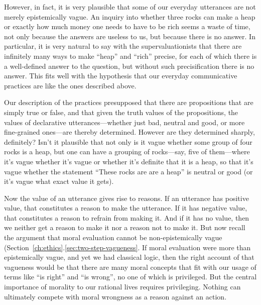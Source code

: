 However, in fact, it is very plausible that some of our everyday utterances are not merely epistemically vague. An inquiry into whether three rocks can make 
a heap or exactly how much money one needs to have to be rich seems a waste of time, not only because the answers are useless to us, 
but because there is no answer. In particular, it is very natural to say with the supervaluationists that there are infinitely many 
ways to make ``heap'' and ``rich'' precise, for each of which there is a well-defined answer to the question, but without such
precisification there is no answer. This fits well with the hypothesis that our everyday communicative practices are  
like the ones described above. 

Our description of the practices presupposed that there are propositions that are simply true or false, and that given the truth
values of the propositions, the values of declarative utterances---whether just bad, neutral and good, or more fine-grained ones---are thereby
determined. However are they determined sharply, definitely? Isn't it plausible that not only is it vague whether some group of four rocks is a heap, 
but one can have a grouping of rocks---say, five of them---where it's vague whether it's vague or whether it's definite that it is a heap, so that 
it's vague whether the statement ``These rocks are are a heap'' is neutral or good (or it's vague what exact value it gets).

Now the value of an utterance gives rise to reasons. If an utterance has positive value, that constitutes a reason to make the utterance.
If it has negative value, that constitutes a reason to refrain from making it. And if it has no value, then we neither get a reason to make
it nor a reason not to make it. But now recall the argument that moral evaluation 
cannot be non-epistemically vague (Section~\ref{ch:ethics}.\ref{sec:two-step-vagueness}. If moral evaluation were more than epistemically vague, and yet we had classical logic, then the right account 
of that vagueness would be that there
are many moral concepts that fit with our usage of terms like ``is right'' and ``is wrong'', no one of which is privileged. But the 
central importance of morality to our rational lives requires privileging. Nothing can ultimately compete with moral wrongness as a reason
against an action. 

